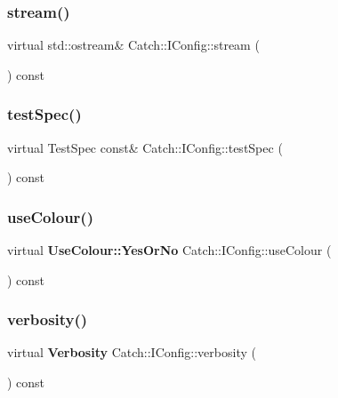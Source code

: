 \mbox{\label{struct_catch_1_1_i_config_aa4c3fe0825e7e6ebdcfa6abc7abf3617}} 
\subsubsection{stream()}
{\footnotesize\ttfamily virtual std\+::ostream\& Catch\+::\+I\+Config\+::stream (\begin{DoxyParamCaption}{ }\end{DoxyParamCaption}) const\hspace{0.3cm}{\ttfamily [pure virtual]}}

\mbox{\label{struct_catch_1_1_i_config_a03a2fd8221d896d12bf3684ab2a03588}} 
\subsubsection{testSpec()}
{\footnotesize\ttfamily virtual Test\+Spec const\& Catch\+::\+I\+Config\+::test\+Spec (\begin{DoxyParamCaption}{ }\end{DoxyParamCaption}) const\hspace{0.3cm}{\ttfamily [pure virtual]}}

\mbox{\label{struct_catch_1_1_i_config_a87ec19a6b486eb5b5015cf7738fee026}} 
\subsubsection{useColour()}
{\footnotesize\ttfamily virtual \textbf{ Use\+Colour\+::\+Yes\+Or\+No} Catch\+::\+I\+Config\+::use\+Colour (\begin{DoxyParamCaption}{ }\end{DoxyParamCaption}) const\hspace{0.3cm}{\ttfamily [pure virtual]}}

\mbox{\label{struct_catch_1_1_i_config_a55aff5924bdbb3f558775821b1eb4b3d}} 
\subsubsection{verbosity()}
{\footnotesize\ttfamily virtual \textbf{ Verbosity} Catch\+::\+I\+Config\+::verbosity (\begin{DoxyParamCaption}{ }\end{DoxyParamCaption}) const\hspace{0.3cm}{\ttfamily [pure virtual]}}

